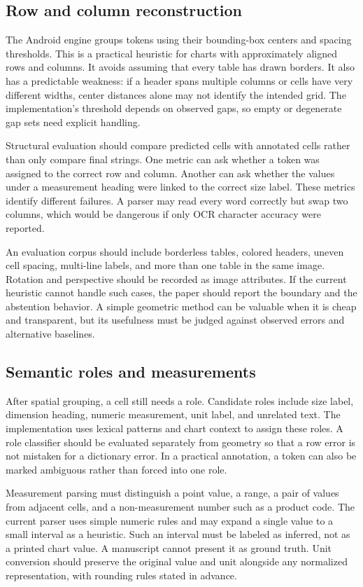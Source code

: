 \documentclass[10pt,letterpaper]{article}
\begin{document}
\subsection{Row and column reconstruction}

The Android engine groups tokens using their bounding-box centers and spacing thresholds. This is a practical heuristic for charts with approximately aligned rows and columns. It avoids assuming that every table has drawn borders. It also has a predictable weakness: if a header spans multiple columns or cells have very different widths, center distances alone may not identify the intended grid. The implementation's threshold depends on observed gaps, so empty or degenerate gap sets need explicit handling.

Structural evaluation should compare predicted cells with annotated cells rather than only compare final strings. One metric can ask whether a token was assigned to the correct row and column. Another can ask whether the values under a measurement heading were linked to the correct size label. These metrics identify different failures. A parser may read every word correctly but swap two columns, which would be dangerous if only OCR character accuracy were reported.

An evaluation corpus should include borderless tables, colored headers, uneven cell spacing, multi-line labels, and more than one table in the same image. Rotation and perspective should be recorded as image attributes. If the current heuristic cannot handle such cases, the paper should report the boundary and the abstention behavior. A simple geometric method can be valuable when it is cheap and transparent, but its usefulness must be judged against observed errors and alternative baselines.

\subsection{Semantic roles and measurements}

After spatial grouping, a cell still needs a role. Candidate roles include size label, dimension heading, numeric measurement, unit label, and unrelated text. The implementation uses lexical patterns and chart context to assign these roles. A role classifier should be evaluated separately from geometry so that a row error is not mistaken for a dictionary error. In a practical annotation, a token can also be marked ambiguous rather than forced into one role.

Measurement parsing must distinguish a point value, a range, a pair of values from adjacent cells, and a non-measurement number such as a product code. The current parser uses simple numeric rules and may expand a single value to a small interval as a heuristic. Such an interval must be labeled as inferred, not as a printed chart value. A manuscript cannot present it as ground truth. Unit conversion should preserve the original value and unit alongside any normalized representation, with rounding rules stated in advance.
\end{document}
